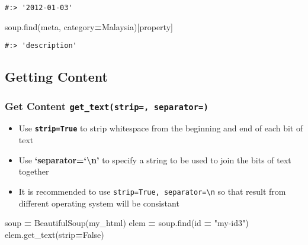\documentclass[
]{book}
\newenvironment{Shaded}{\begin{snugshade}}{\end{snugshade}}
\newcommand{\BuiltInTok}[1]{#1}
\newcommand{\NormalTok}[1]{#1}
\newcommand{\OperatorTok}[1]{\textcolor[rgb]{0.43,0.43,0.43}{\textbf{#1}}}
\newcommand{\StringTok}[1]{\textcolor[rgb]{0.5,0.5,0.5}{#1}}
\newcommand{\VariableTok}[1]{\textcolor[rgb]{0,0,0}{#1}}
\providecommand{\tightlist}{%
  \setlength{\itemsep}{0pt}\setlength{\parskip}{0pt}}
\begin{document}
\begin{verbatim}
#:> '2012-01-03'
\end{verbatim}

\begin{Shaded}
\begin{Highlighting}[]
\NormalTok{soup.find(}\StringTok{\textquotesingle{}meta\textquotesingle{}}\NormalTok{, category}\OperatorTok{=}\StringTok{\textquotesingle{}Malaysia\textquotesingle{}}\NormalTok{)[}\StringTok{\textquotesingle{}property\textquotesingle{}}\NormalTok{]}
\end{Highlighting}
\end{Shaded}

\begin{verbatim}
#:> 'description'
\end{verbatim}

\hypertarget{getting-content}{%
\subsection{Getting Content}\label{getting-content}}

\hypertarget{get-content-get_textstrip-separator}{%
\subsubsection{\texorpdfstring{Get Content \texttt{get\_text(strip=,\ separator=)}}{Get Content get\_text(strip=, separator=)}}\label{get-content-get_textstrip-separator}}

\begin{itemize}
\tightlist
\item
  Use \textbf{\texttt{strip=True}} to strip whitespace from the beginning and end of each bit of text\\
\item
  Use \textbf{`separator=`\textbackslash n'} to specify a string to be used to join the bits of text together
\item
  It is recommended to use \texttt{strip=True,\ separator=\textquotesingle{}\textbackslash{}n\textquotesingle{}} so that result from different operating system will be consistant
\end{itemize}

\begin{Shaded}
\begin{Highlighting}[]
\NormalTok{soup }\OperatorTok{=}\NormalTok{ BeautifulSoup(my\_html)}
\NormalTok{elem }\OperatorTok{=}\NormalTok{ soup.find(}\BuiltInTok{id} \OperatorTok{=} \StringTok{"my{-}id3"}\NormalTok{)}
\NormalTok{elem.get\_text(strip}\OperatorTok{=}\VariableTok{False}\NormalTok{)}
\end{Highlighting}
\end{Shaded}
\end{document}
